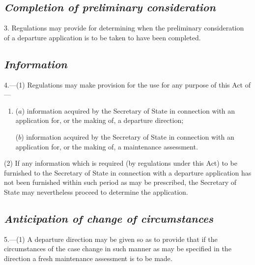 \documentclass[12pt,a4paper]{article}
\begin{document}

\subsection*{\itshape Completion of preliminary consideration}

3. Regulations may provide for determining when the preliminary consideration of a departure application is to be taken to have been completed.

\subsection*{\itshape Information}

4.---(1) Regulations may make provision for the use for any purpose of this Act of—
\begin{enumerate}\item[]
($a$) information acquired by the Secretary of State in connection with an application for, or the making of, a departure direction;

($b$) information acquired by 
the Secretary of State in connection with an application for, or the making of, a maintenance assessment.
\end{enumerate}

(2) If any information which is required (by regulations under this Act) to be furnished to the Secretary of State in connection with a departure application has not been furnished within such period as may be prescribed, the Secretary of State may nevertheless proceed to determine the application.


\subsection*{\itshape Anticipation of change of circumstances}

5.---(1) A departure direction may be given so as to provide that if the circumstances of the case change in such manner as may be specified in the direction a fresh maintenance assessment is to be made.
\end{document}
